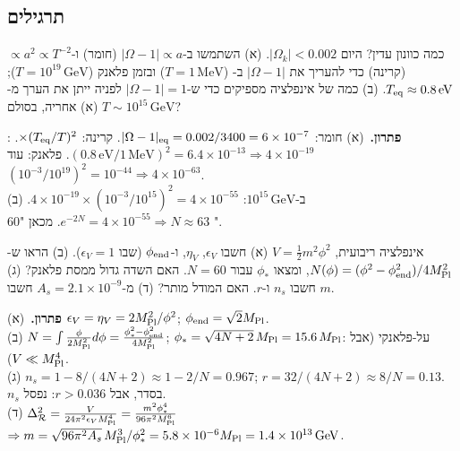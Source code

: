\subsection*{תרגילים}
\begin{exercise}{כמה כוונון עדין?}
היום $|\Omega_k|<0.002$. (א) השתמשו ב-$|\Omega-1|\propto a$ (חומר) ו-$\propto a^2\propto T^{-2}$ (קרינה) כדי להעריך את $|\Omega-1|$ ב- ($T=1\,\mathrm{MeV}$) ובזמן פלאנק ($T=10^{19}\,\mathrm{GeV}$); $T_{\rm eq}\approx0.8\,\mathrm{eV}$. (ב) כמה  של אינפלציה מספיקים כדי ש-$|\Omega-1|=1$ לפניה ייתן את הערך מ-(א) אחריה, בסולם $T\sim10^{15}\,\mathrm{GeV}$?
\end{exercise}
\begin{solbox}
\textbf{פתרון.}\ (א) חומר: $|\Omega-1|_{\rm eq}=0.002/3400=6\times10^{-7}$. קרינה: $\times(T_{\rm eq}/T)^2$. : $(0.8\,\mathrm{eV}/1\,\mathrm{MeV})^2=6.4\times10^{-13}\Rightarrow4\times10^{-19}$. פלאנק: עוד $(10^{-3}/10^{19})^2=10^{-44}\Rightarrow4\times10^{-63}$.\\
(ב) ב-$10^{15}\,\mathrm{GeV}$: $4\times10^{-19}\times(10^{-3}/10^{15})^2=4\times10^{-55}$. $e^{-2N}=4\times10^{-55}\Rightarrow N\approx63$. מכאן "60 ".
\end{solbox}

\begin{exercise}{אינפלציה ריבועית, $V=\tfrac12m^2\phi^2$}
(א) חשבו $\epsilon_V$, $\eta_V$, ו-$\phi_{\rm end}$ (שבו $\epsilon_V=1$). (ב) הראו ש-$N(\phi)=(\phi^2-\phi_{\rm end}^2)/4M_{\rm Pl}^2$, ומצאו $\phi_*$ עבור $N=60$. האם השדה גדול ממסת פלאנק? (ג) חשבו $n_s$ ו-$r$. האם המודל מותר? (ד) מ-$A_s=2.1\times10^{-9}$ חשבו $m$.
\end{exercise}
\begin{solbox}
\textbf{פתרון.}\ (א) $\epsilon_V=\eta_V=2M_{\rm Pl}^2/\phi^2$; $\phi_{\rm end}=\sqrt2M_{\rm Pl}$.\\
(ב) $N=\int\frac{\phi}{2M_{\rm Pl}^2}d\phi=\frac{\phi_*^2-\phi_{\rm end}^2}{4M_{\rm Pl}^2}$; $\phi_*=\sqrt{4N+2}\,M_{\rm Pl}=15.6\,M_{\rm Pl}$: על-פלאנקי (אבל $V\ll M_{\rm Pl}^4$).\\
(ג) $n_s=1-8/(4N+2)\approx1-2/N=0.967$; $r=32/(4N+2)\approx8/N=0.13$. $n_s$ בסדר, אבל $r>0.036$: נפסל.\\
(ד) $\Delta^2_{\mathcal R}=\frac{V}{24\pi^2\epsilon_VM_{\rm Pl}^4}=\frac{m^2\phi_*^4}{96\pi^2M_{\rm Pl}^6}$ $\Rightarrow m=\sqrt{96\pi^2A_s}\,M_{\rm Pl}^3/\phi_*^2=5.8\times10^{-6}M_{\rm Pl}=1.4\times10^{13}\,\mathrm{GeV}$.
\end{solbox}

